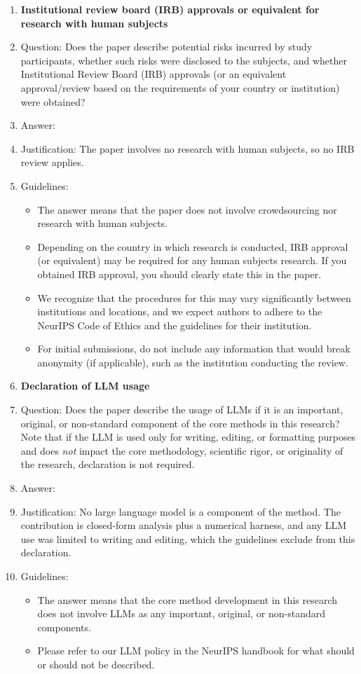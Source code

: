 \begin{enumerate}
\item {\bf Institutional review board (IRB) approvals or equivalent for research with human subjects}
    \item[] Question: Does the paper describe potential risks incurred by study participants, whether such risks were disclosed to the subjects, and whether Institutional Review Board (IRB) approvals (or an equivalent approval/review based on the requirements of your country or institution) were obtained?
    \item[] Answer: \answerNA{}
    \item[] Justification: The paper involves no research with human subjects, so no IRB review applies.
    \item[] Guidelines:
    \begin{itemize}
        \item The answer \answerNA{} means that the paper does not involve crowdsourcing nor research with human subjects.
        \item Depending on the country in which research is conducted, IRB approval (or equivalent) may be required for any human subjects research. If you obtained IRB approval, you should clearly state this in the paper. 
        \item We recognize that the procedures for this may vary significantly between institutions and locations, and we expect authors to adhere to the NeurIPS Code of Ethics and the guidelines for their institution. 
        \item For initial submissions, do not include any information that would break anonymity (if applicable), such as the institution conducting the review.
    \end{itemize}

\item {\bf Declaration of LLM usage}
    \item[] Question: Does the paper describe the usage of LLMs if it is an important, original, or non-standard component of the core methods in this research? Note that if the LLM is used only for writing, editing, or formatting purposes and does \emph{not} impact the core methodology, scientific rigor, or originality of the research, declaration is not required.
    \item[] Answer: \answerNA{}
    \item[] Justification: No large language model is a component of the method. The contribution is closed-form analysis plus a numerical harness, and any LLM use was limited to writing and editing, which the guidelines exclude from this declaration.
    \item[] Guidelines:
    \begin{itemize}
        \item The answer \answerNA{} means that the core method development in this research does not involve LLMs as any important, original, or non-standard components.
        \item Please refer to our LLM policy in the NeurIPS handbook for what should or should not be described.
    \end{itemize}

\end{enumerate}